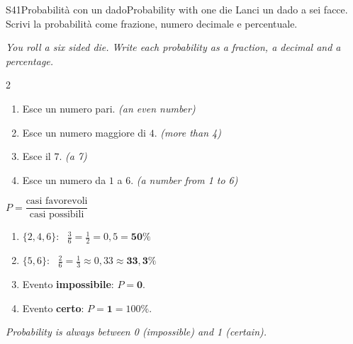 \documentclass[11pt,a4paper]{article}
\newcommand{\en}[1]{\par{\small\itshape\color{engray}#1\par}}
\newcommand{\enx}[1]{{\small\itshape\color{engray}(#1)}}
\begin{document}
\begin{esercizio}{S4}{1}{Probabilità con un dado}{Probability with one die}
Lanci un dado a sei facce. Scrivi la probabilità come frazione, numero decimale e percentuale.
\en{You roll a six sided die. Write each probability as a fraction, a decimal and a percentage.}
\begin{multicols}{2}
\begin{enumerate}
\item Esce un numero pari. \enx{an even number}
\item Esce un numero maggiore di $4$. \enx{more than 4}
\item Esce il $7$. \enx{a 7}
\item Esce un numero da $1$ a $6$. \enx{a number from 1 to 6}
\end{enumerate}
\end{multicols}
\end{esercizio}
\begin{solbox}
$P=\dfrac{\text{casi favorevoli}}{\text{casi possibili}}$
\begin{enumerate}
\item $\{2,4,6\}$: \ $\frac36=\frac12=0,5=\mathbf{50\%}$
\item $\{5,6\}$: \ $\frac26=\frac13\approx0,33\approx\mathbf{33,3\%}$
\item Evento \textbf{impossibile}: $P=\mathbf{0}$.
\item Evento \textbf{certo}: $P=\mathbf{1}=100\%$.
\end{enumerate}
\en{Probability is always between 0 (impossible) and 1 (certain).}
\end{solbox}
\end{document}
